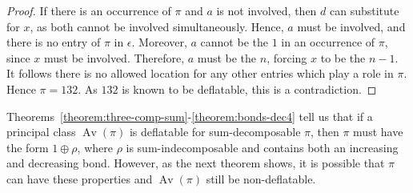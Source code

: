 \documentclass[10pt]{article}
\theoremstyle{plain}
\newcommand{\Av}{\operatorname{Av}}
\begin{document}
\begin{proof}
If there is an occurrence of $\pi$ and $a$ is not involved, then $d$ can substitute for $x$, as both cannot be involved simultaneously. Hence, $a$ must be involved, and there is no entry of $\pi$ in $\epsilon$. Moreover, $a$ cannot be the $1$ in an occurrence of $\pi$, since $x$ must be involved. Therefore, $a$ must be the $n$, forcing $x$ to be the $n-1$. It follows there is no allowed location for any other entries which play a role in $\pi$. Hence $\pi=132$. As $132$ is known to be deflatable, this is a contradiction.
\end{proof}

Theorems~\ref{theorem:three-comp-sum}-\ref{theorem:bonds-dec4} tell us that if a principal class $\Av(\pi)$ is deflatable for sum-decomposable $\pi$, then $\pi$ must have the form $1 \oplus \rho$, where $\rho$ is sum-indecomposable and contains both an increasing and decreasing bond. However, as the next theorem shows, it is  possible that $\pi$ can have these properties and $\Av(\pi)$ still be non-deflatable.


\end{document}
